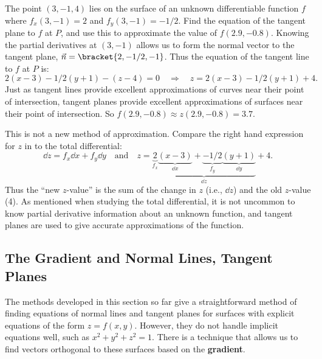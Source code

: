 \begin{example}\label{ex_tpl7}
The point $(3,-1,4)$ lies on the surface of an unknown differentiable function $f$ where $f_x(3,-1) = 2$ and $f_y(3,-1) = -1/2$. Find the equation of the tangent plane to $f$ at $P$, and use this to approximate the value of $f(2.9,-0.8)$.
\solution
Knowing the partial derivatives at $(3,-1)$ allows us to form the normal vector to the tangent plane, $\vec n =\bracket{2,-1/2,-1}$. Thus the equation of the tangent line to $f$ at $P$ is:
\begin{equation}
2(x-3)-1/2(y+1) - (z-4) = 0
\quad \Rightarrow \quad
z = 2(x-3)-1/2(y+1)+4.\label{eq:tpl7}
\end{equation}
Just as tangent lines provide excellent approximations of curves near their point of intersection, tangent planes provide excellent approximations of surfaces near their point of intersection. So $f(2.9,-0.8) \approx z(2.9,-0.8) = 3.7.$

This is not a new method of approximation. Compare the right hand expression for $z$ in  to the total differential:
\[
\dd z = f_x\dd x + f_y\dd y \quad \text{and} \quad z =
\underbrace{\underbrace{2}_{f_x}\underbrace{(x-3)}_{\dd x}
+\underbrace{-1/2}_{f_y}\underbrace{(y+1)}_{\dd y}}_{\dd z}+4.
\]
Thus the ``new $z$-value'' is the sum of the change in $z$ (i.e., $\dd z$) and the old $z$-value (4). As mentioned when studying the total differential, it is not uncommon to know partial derivative information about an unknown function, and tangent planes are used to give accurate approximations of the function.
\end{example}

\subsection{The Gradient and Normal Lines, Tangent Planes}

The methods developed in this section so far give a straightforward method of finding equations of normal lines and tangent planes for surfaces with explicit equations of the form $z=f(x,y)$. However, they do not handle implicit equations well, such as $x^2+y^2+z^2=1$. There is a technique that allows us to find vectors orthogonal to these surfaces based on the \textbf{gradient}.


